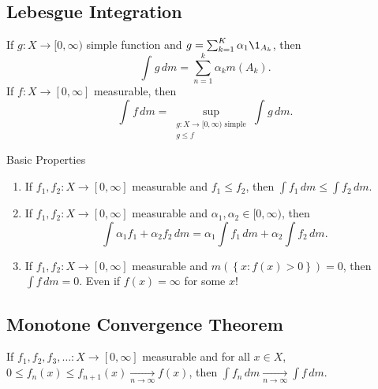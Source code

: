 \subsection{Lebesgue Integration}

\begin{definition}
	If $g : X \to [0, \infty)$ simple function and $g = \sum_{k = 1}^{K} \alpha_1 \1_{A_k}$, then
\[
	\int_{}^{} g \,dm = \sum_{n = 1}^{k} \alpha_k m(A_k).
\]
If $f : X \to [0, \infty]$ measurable, then
\[
	\int_{}^{} f \,dm = \sup_{\substack{g : X  \to [0, \infty) \textrm{ simple} \\ g \leq f}} \int_{}^{} g \,dm.
\]
\end{definition}

Basic Properties
\begin{enumerate}
	\item If $f_1, f_2 : X \to [0, \infty]$ measurable and $f_1 \leq f_2$, then $\int f_1 \, dm \leq \int f_2 \, dm$.
	\item If $f_1, f_2 : X \to [0, \infty]$ measurable and $\alpha_1, \alpha_2 \in [0, \infty)$, then
	\[
		\int \alpha_1 f_1 + \alpha_2 f_2 \, dm = \alpha_1 \int f_1 \, dm + \alpha_2 \int f_2 \, dm.
	\]
	\item If $f_1, f_2 : X \to [0, \infty]$ measurable and $m( \left\{x : f(x) > 0 \right\}) = 0$, then $\int f \,dm = 0$. Even if $f(x) = \infty$ for some $x$!
\end{enumerate}

\subsection{Monotone Convergence Theorem}

\begin{theorem}
	If $f_1, f_2, f_3, \ldots : X \to [0, \infty]$ measurable and for all $x \in X$, $0 \leq f_n(x) \leq f_{n+1}(x) \xrightarrow[n \to \infty]{} f(x)$, then $\int f_n \, dm \xrightarrow[n \to \infty]{} \int f \, dm$.
\end{theorem}


